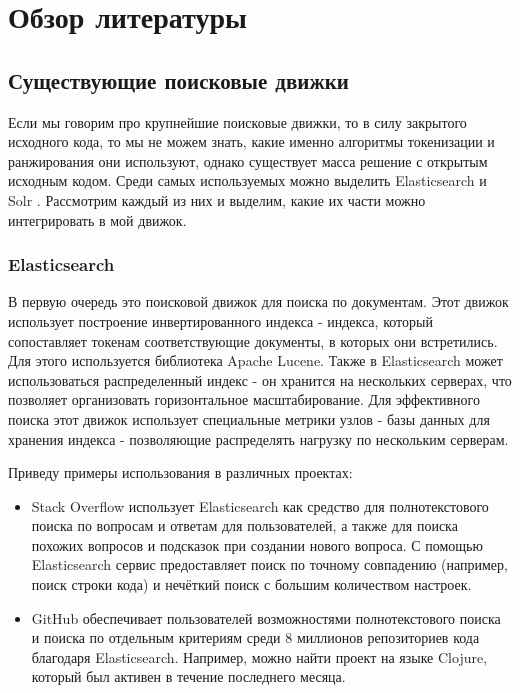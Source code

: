 \section{Обзор литературы}

\subsection{Существующие поисковые движки}
Если мы говорим про крупнейшие поисковые движки, то в силу закрытого исходного кода, то мы не можем знать, 
какие именно алгоритмы токенизации и ранжирования они используют, однако существует масса решение с открытым 
исходным кодом. Среди самых используемых можно выделить Elasticsearch \cite{elastic} и Solr \cite{solr}. Рассмотрим каждый из них и 
выделим, какие их части можно интегрировать в мой движок.

\subsubsection{Elasticsearch}
В первую очередь это поисковой движок для поиска по документам. Этот движок использует построение инвертированного 
индекса - индекса, который сопоставляет токенам соответствующие документы, в которых они встретились. Для этого используется 
библиотека Apache Lucene. Также в Elasticsearch может использоваться распределенный индекс - он хранится на нескольких 
серверах, что позволяет организовать горизонтальное масштабирование. Для эффективного поиска этот движок использует 
специальные метрики узлов - базы данных для хранения индекса - позволяющие распределять нагрузку по нескольким серверам. 

Приведу примеры использования в различных проектах:
\begin{itemize}
    \item {Stack Overflow использует Elasticsearch как средство для полнотекстового поиска по вопросам и 
    ответам для пользователей, а также для поиска похожих вопросов и подсказок при создании нового 
    вопроса. С помощью Elasticsearch сервис предоставляет поиск по точному совпадению (например, поиск строки кода) 
    и нечёткий поиск с большим количеством настроек.}
    \item {GitHub обеспечивает пользователей возможностями полнотекстового поиска и поиска по отдельным критериям среди 
    8 миллионов репозиториев кода благодаря Elasticsearch. Например, можно найти проект на языке Clojure, который 
    был активен в течение последнего месяца.}
\end{itemize}

